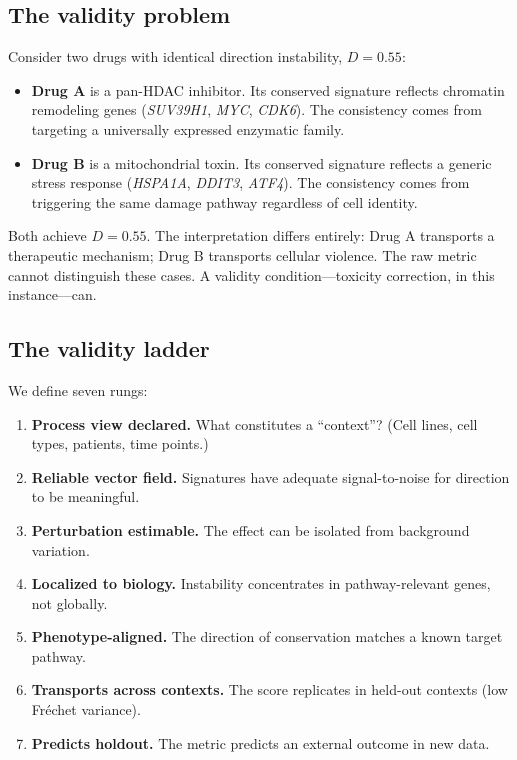 \documentclass{article}
\begin{document}
\subsection{The validity problem}

Consider two drugs with identical direction instability, $D = 0.55$:

\begin{itemize}
  \item \textbf{Drug A} is a pan-HDAC inhibitor. Its conserved signature
    reflects chromatin remodeling genes (\emph{SUV39H1}, \emph{MYC},
    \emph{CDK6}). The consistency comes from targeting a universally
    expressed enzymatic family.
  \item \textbf{Drug B} is a mitochondrial toxin. Its conserved signature
    reflects a generic stress response (\emph{HSPA1A}, \emph{DDIT3},
    \emph{ATF4}). The consistency comes from triggering the same damage
    pathway regardless of cell identity.
\end{itemize}

Both achieve $D = 0.55$. The interpretation differs entirely: Drug A
transports a therapeutic mechanism; Drug B transports cellular violence. The
raw metric cannot distinguish these cases. A validity condition---toxicity
correction, in this instance---can.

\subsection{The validity ladder}

We define seven rungs:

\begin{enumerate}
  \item \textbf{Process view declared.} What constitutes a ``context''?
    (Cell lines, cell types, patients, time points.)
  \item \textbf{Reliable vector field.} Signatures have adequate signal-to-noise
    for direction to be meaningful.
  \item \textbf{Perturbation estimable.} The effect can be isolated from
    background variation.
  \item \textbf{Localized to biology.} Instability concentrates in
    pathway-relevant genes, not globally.
  \item \textbf{Phenotype-aligned.} The direction of conservation matches a
    known target pathway.
  \item \textbf{Transports across contexts.} The score replicates in held-out
    contexts (low Fr\'echet variance).
  \item \textbf{Predicts holdout.} The metric predicts an external outcome
    in new data.
\end{enumerate}
\end{document}
